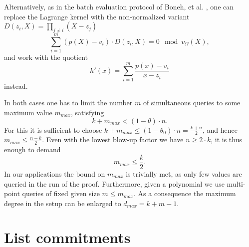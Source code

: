 \documentclass[11pt,article,oneside]{memoir}
\theoremstyle{definition}
\theoremstyle{remark}
\begin{document}
Alternatively, as in the batch evaluation protocol of Boneh, et al. \cite{HaloInfinite}, one can replace the Lagrange kernel with the non-normalized variant $D(z_i,X)=\prod_{j\neq i} (X-z_j)$ 
\begin{equation}
\label{e:MultiEvalIdentity2}
\sum_{i=1}^m (p(X)-v_i) \cdot D(z_i,X) =  
0 \mod v_\Omega(X),
\end{equation}
and work with the quotient 
\[
h'(x) =%
\sum_{i=1}^m \frac{p(x)-v_i}{x-z_i}
\]
instead.

In both cases one has to limit the number $m$ of simultaneous queries to some maximum value $m_{max}$, satisfying 
\[
k+m_{max} < (1-\theta)\cdot n.
\]
For this it is sufficient to choose $k+m_{max} \leq  (1- \theta_0)\cdot n =\frac{k+n}{2}$, and hence $m_{max}\leq\frac{n-k}{2}$. 
Even with the lowest blow-up factor we have $n\geq 2\cdot k$, it is thus enough to demand
\begin{equation}
m_{max}\leq \frac{k}{2}.
\end{equation}
In our applications the bound on $m_{max}$ is trivially met, as only few values are queried in the run of the proof. 
Furthermore, given a polynomial we use multi-point queries of fixed given size $m\leq m_{max}$. 
As a consequence the maximum degree in the setup can be enlarged to $d_{max}= k+m-1$.  

\section{List commitments}
\end{document}
